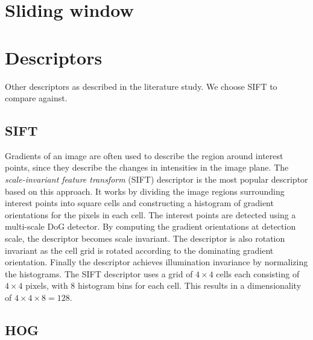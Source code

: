 \documentclass[thesis.tex]{subfiles}
\begin{document}
\section{Sliding window}
\label{sec:slidingWindow}

\section{Descriptors}

Other descriptors as described in the literature study. We choose SIFT to compare against.

\subsection{SIFT}

Gradients of an image are often used to describe the region around interest points, since they describe the changes in intensities in the image plane.
The \emph{scale-invariant feature transform} (SIFT) descriptor
\cite{lowe2004distinctive} is the most popular descriptor based on this
approach. It works by dividing the image regions surrounding interest
points into square cells and constructing a histogram of gradient
orientations for the pixels in each cell. The interest points are detected
using a multi-scale DoG detector. By computing the gradient orientations
at detection scale, the descriptor becomes scale invariant. The descriptor
is also rotation invariant as the cell grid is rotated according to the
dominating gradient orientation. Finally the descriptor achieves illumination
invariance by normalizing the histograms. The SIFT descriptor uses a grid of
$4 \times 4$ cells each consisting of $4 \times 4$ pixels, with 8 histogram
bins for each cell. This results in a dimensionality of $4 \times 4 \times 8 =
128$.


\subsection{HOG}
\end{document}
